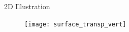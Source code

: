 \documentclass{beamer}
\newlength{\sndcolwid}
\newcommand{\Ex}{\mathbb{E}}
\newcommand{\Var}{\mathbb{V}\mathrm{ar}}
\newcommand{\Prob}{\mathbb{P}}
\DeclareMathOperator*{\argmin}{arg\,min}
\DeclareMathOperator*{\argmax}{arg\,max}
\newcommand{\yobs}{\bm{y}_{\mathrm{obs}}}
\newcommand{\kest}{\hat{\bm{k}}}
\begin{document}
\begin{frame}[t]
\begin{columns}[t]
\begin{column}{\sndcolwid}
\begin{block}{2D Illustration}




    \begin{figure}[!h]
      \centering
      \texttt{[image: surface\_transp\_vert]}
    \end{figure}
  \end{block}

  
 


\end{column}
\end{columns}
\end{frame}
\end{document}
